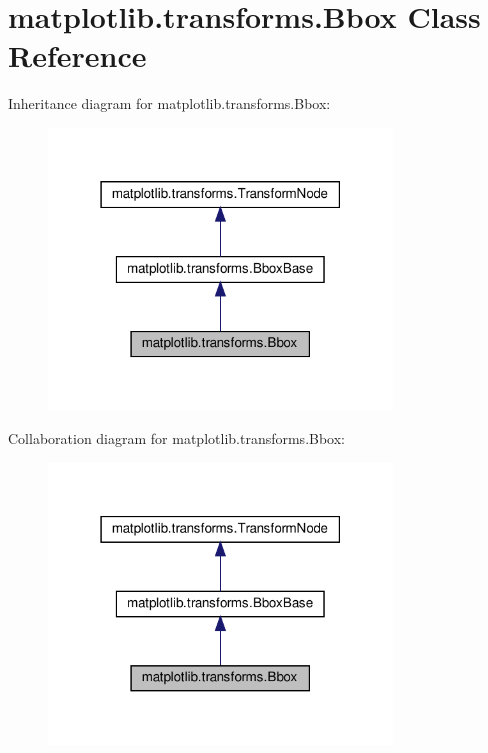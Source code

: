 \hypertarget{classmatplotlib_1_1transforms_1_1Bbox}{}\section{matplotlib.\+transforms.\+Bbox Class Reference}
\label{classmatplotlib_1_1transforms_1_1Bbox}


Inheritance diagram for matplotlib.\+transforms.\+Bbox\+:
\nopagebreak
\begin{figure}[H]
\begin{center}
\leavevmode
\includegraphics[width=259pt]{classmatplotlib_1_1transforms_1_1Bbox__inherit__graph}
\end{center}
\end{figure}


Collaboration diagram for matplotlib.\+transforms.\+Bbox\+:
\nopagebreak
\begin{figure}[H]
\begin{center}
\leavevmode
\includegraphics[width=259pt]{classmatplotlib_1_1transforms_1_1Bbox__coll__graph}
\end{center}
\end{figure}
